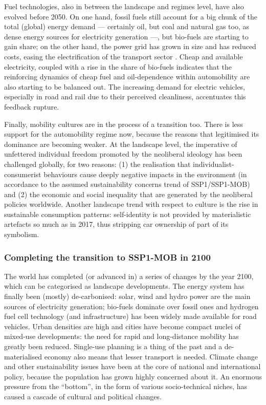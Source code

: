 Fuel technologies, also in between the landscape and regimes level, have also evolved before 2050. On one hand, fossil fuels still account for a big chunk of the total (global) energy demand --- certainly oil, but coal and natural gas too, as dense energy sources for electricity generation ---, but bio-fuels are starting to gain share; on the other hand, the power grid has grown in size and has reduced costs, easing the electrification of the transport sector \parencite{vuuren2017_Energylanduse}. Cheap and available electricity, coupled with a rise in the share of bio-fuels indicates that the reinforcing dynamics of cheap fuel and oil-dependence within automobility are also starting to be balanced out. The increasing demand for electric vehicles, especially in road and rail due to their perceived cleanliness, accentuates this feedback rupture.

Finally, mobility cultures are in the process of a transition too. There is less support for the automobility regime now, because the reasons that legitimised its dominance are becoming weaker. At the landscape level, the imperative of unfettered individual freedom promoted by the neoliberal ideology has been challenged globally, for two reasons: (1) the realisation that individualist-consumerist behaviours cause deeply negative impacts in the environment (in accordance to the assumed sustainability concerns trend of SSP1/SSP1-MOB) and (2) the economic and social inequality that are generated by the neoliberal policies worldwide. Another landscape trend with respect to culture is the rise in sustainable consumption patterns: self-identity is not provided by materialistic artefacts so much as in 2017, thus stripping car ownership of part of its symbolism.

\subsubsection*{Completing the transition to SSP1-MOB in 2100}
The world has completed (or advanced in) a series of changes by the year 2100, which can be categorised as landscape developments. The energy system has finally been (mostly) de-carbonised: solar, wind and hydro power are the main sources of electricity generation; bio-fuels dominate over fossil ones and hydrogen fuel cell technology (and infrastructure) has been widely made available for road vehicles. Urban densities are high and cities have become compact nuclei of mixed-use developments: the need for rapid and long-distance mobility has greatly been reduced. Single-use planning is a thing of the past and a de-materialised economy also means that lesser transport is needed. Climate change and other sustainability issues have been at the core of national and international policy, because the population has grown highly concerned about it. An enormous pressure from the ``bottom'', in the form of various socio-technical niches, has caused a cascade of cultural and political changes.

